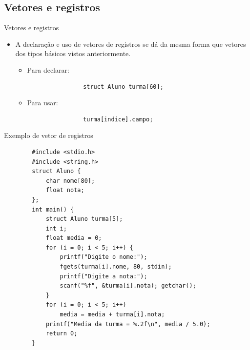 \documentclass[handout]{beamer}
\begin{document}
\subsection{Vetores e registros}

\begin{frame}[fragile]{Vetores e registros}

    \begin{itemize}
        \item A declaração e uso de vetores de registros se dá da mesma forma que
        vetores dos tipos básicos vistos anteriormente.

        \begin{itemize}
            \item Para declarar:
            \begin{verbatim}
                struct Aluno turma[60];
            \end{verbatim}

            \item Para usar:
            \begin{verbatim}
                turma[indice].campo;
            \end{verbatim}
        \end{itemize}
    \end{itemize}

\end{frame}

\begin{frame}[fragile]{Exemplo de vetor de registros}
    \vspace{-1em}
    \begin{verbatim}
        #include <stdio.h>
        #include <string.h>
        struct Aluno {
            char nome[80];
            float nota;
        };
        int main() {
            struct Aluno turma[5];
            int i;
            float media = 0;
            for (i = 0; i < 5; i++) {
                printf("Digite o nome:");
                fgets(turma[i].nome, 80, stdin);
                printf("Digite a nota:");
                scanf("%f", &turma[i].nota); getchar();
            }
            for (i = 0; i < 5; i++)
                media = media + turma[i].nota;
            printf("Media da turma = %.2f\n", media / 5.0);
            return 0;
        }
    \end{verbatim}

\end{frame}
\end{document}
